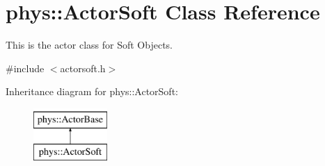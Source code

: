 \hypertarget{classphys_1_1ActorSoft}{
\section{phys::ActorSoft Class Reference}
\label{d4/d23/classphys_1_1ActorSoft}
}


This is the actor class for Soft Objects.  




{\ttfamily \#include $<$actorsoft.h$>$}

Inheritance diagram for phys::ActorSoft:\begin{figure}[H]
\begin{center}
\leavevmode
\includegraphics[height=2.000000cm]{d4/d23/classphys_1_1ActorSoft}
\end{center}
\end{figure}
